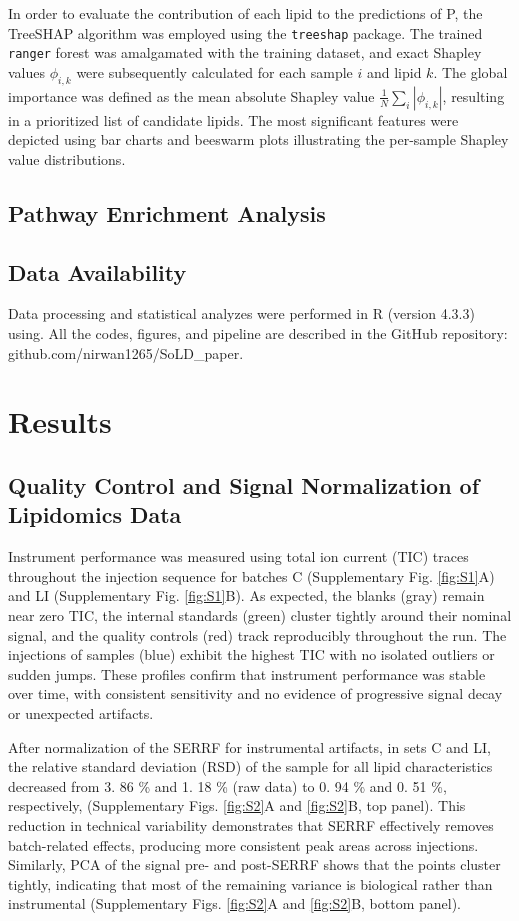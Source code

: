 \documentclass[10pt,letterpaper]{article}
\begin{document}
In order to evaluate the contribution of each lipid to the predictions of P, the TreeSHAP algorithm was employed using the \texttt{treeshap} package. The trained \texttt{ranger} forest was amalgamated with the training dataset, and exact Shapley values $\phi_{i,k}$ were subsequently calculated for each sample $i$ and lipid $k$. The global importance was defined as the mean absolute Shapley value $\frac{1}{N}\sum_i|\phi_{i,k}|$, resulting in a prioritized list of candidate lipids. The most significant features were depicted using bar charts and beeswarm plots illustrating the per-sample Shapley value distributions.

\subsection*{Pathway Enrichment Analysis}

\subsection*{Data Availability}
Data processing and statistical analyzes were performed in R (version 4.3.3) using. All the codes, figures, and pipeline are described in the GitHub repository: github.com/nirwan1265/SoLD\_paper.

\section*{Results}

\subsection*{Quality Control and Signal Normalization of Lipidomics Data}
Instrument performance was measured using total ion current (TIC) traces throughout the injection sequence for batches C (Supplementary Fig. \ref{fig:S1}A) and LI (Supplementary Fig. \ref{fig:S1}B). As expected, the blanks (gray) remain near zero TIC, the internal standards (green) cluster tightly around their nominal signal, and the quality controls (red) track reproducibly throughout the run. The injections of samples (blue) exhibit the highest TIC with no isolated outliers or sudden jumps. These profiles confirm that instrument performance was stable over time, with consistent sensitivity and no evidence of progressive signal decay or unexpected artifacts.

After normalization of the SERRF for instrumental artifacts, in sets C and LI, the relative standard deviation (RSD) of the sample  for all lipid characteristics decreased from 3. 86 \% and 1. 18 \% (raw data)  to 0. 94 \% and 0. 51 \%, respectively,  (Supplementary Figs. \ref{fig:S2}A and \ref{fig:S2}B, top panel). This reduction in technical variability demonstrates that SERRF effectively removes batch-related effects, producing more consistent peak areas across injections. Similarly, PCA of the signal pre- and post-SERRF shows that the points cluster tightly, indicating that most of the remaining variance is biological rather than instrumental (Supplementary Figs. \ref{fig:S2}A and \ref{fig:S2}B, bottom panel).
\end{document}
